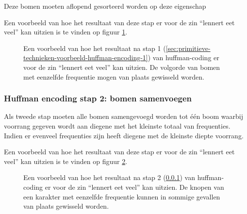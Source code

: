 Deze bomen moeten aflopend gesorteerd worden op deze eigenschap 

Een voorbeeld van hoe het resultaat van deze stap er voor de zin “lennert eet veel” kan uitzien is te vinden op figuur \ref{fig:huffman-stap-1}.

\FloatBarrier
\begin{figure}[h!]
	\caption{Een voorbeeld van hoe het resultaat na stap 1 (\ref{sec:primitieve-technieken-voorbeeld-huffman-encoding-1}) van \gls{huffman-coding} er voor de zin “lennert eet veel” kan uitzien. De volgorde van bomen met eenzelfde frequentie mogen van plaats gewisseld worden.}
	\label{fig:huffman-stap-1}
\end{figure}
\FloatBarrier

\subsubsection{Huffman encoding stap 2: bomen samenvoegen}
\label{sec:primitieve-technieken-voorbeeld-huffman-encoding-2}
Als tweede stap moeten alle bomen samengevoegd worden tot één boom waarbij voorrang gegeven wordt aan diegene met het kleinste totaal van frequenties. Indien er evenveel frequenties zijn heeft diegene met de kleinste diepte voorrang.

Een voorbeeld van hoe het resultaat van deze stap er voor de zin “lennert eet veel” kan uitzien is te vinden op figuur \ref{fig:huffman-stap-2}.

\FloatBarrier
\begin{figure}[h!]
	\caption{Een voorbeeld van hoe het resultaat na stap 2 (\ref{sec:primitieve-technieken-voorbeeld-huffman-encoding-2}) van \gls{huffman-coding} er voor de zin “lennert eet veel” kan uitzien. De knopen van een karakter met eenzelfde frequentie kunnen in sommige gevallen van plaats gewisseld worden.}
	\label{fig:huffman-stap-2}
\end{figure}
\FloatBarrier

